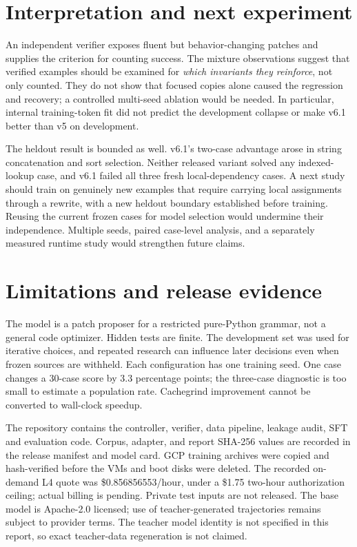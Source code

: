 \documentclass[11pt]{article}
\begin{document}


\section{Interpretation and next experiment}
An independent verifier exposes fluent but behavior-changing patches and
supplies the criterion for counting success. The mixture observations
suggest that verified examples should be examined for \emph{which invariants
they reinforce}, not only counted. They do not show that focused copies alone
caused the regression and recovery; a controlled multi-seed ablation would
be needed. In particular, internal training-token fit did not predict the
development collapse or make v6.1 better than v5 on development.

The heldout result is bounded as well. v6.1's two-case advantage arose in
string concatenation and sort selection. Neither released variant solved any
indexed-lookup case, and v6.1 failed all three fresh local-dependency cases.
A next study should train on genuinely new examples that require carrying
local assignments through a rewrite, with a new heldout boundary established
before training. Reusing the current frozen cases for model selection would
undermine their independence. Multiple seeds, paired case-level analysis,
and a separately measured runtime study would strengthen future claims.

\section{Limitations and release evidence}
The model is a patch proposer for a restricted pure-Python grammar, not a
general code optimizer. Hidden tests are finite. The development set was
used for iterative choices, and repeated research can influence later
decisions even when frozen sources are withheld. Each configuration has one
training seed. One case changes a 30-case score by 3.3 percentage points;
the three-case diagnostic is too small to estimate a population rate.
Cachegrind improvement cannot be converted to wall-clock speedup.

The repository contains the controller, verifier, data pipeline, leakage
audit, SFT and evaluation code. Corpus, adapter, and report SHA-256 values
are recorded in the release manifest and model card. GCP training archives
were copied and hash-verified before the VMs and boot disks were deleted.
The recorded on-demand L4 quote was \$0.856856553/hour, under a \$1.75
two-hour authorization ceiling; actual billing is pending. Private test
inputs are not released. The base model is Apache-2.0 licensed; use of
teacher-generated trajectories remains subject to provider terms. The
teacher model identity is not specified in this report, so exact
teacher-data regeneration is not claimed.
\end{document}
